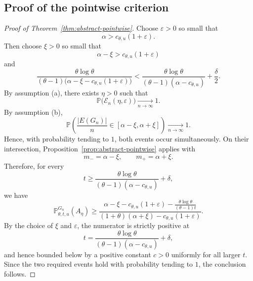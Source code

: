 \documentclass[11pt]{article}
\theoremstyle{remark}
\theoremstyle{plain}
\newcommand{\Pbb}{\mathbb{P}}
\newcommand{\1}{\mathbbm{1}}
\begin{document}
\subsection{Proof of the pointwise criterion}

\begin{proof}[Proof of Theorem~\ref{thm:abstract-pointwise}]
Choose \(\varepsilon>0\) so small that
\[
\alpha>c_{\theta,u}(1+\varepsilon).
\]
Then choose \(\xi>0\) so small that
\[
\alpha-\xi>c_{\theta,u}(1+\varepsilon)
\]
and
\[
\frac{\theta\log\theta}{(\theta-1)\bigl(\alpha-\xi-c_{\theta,u}(1+\varepsilon)\bigr)}
<
\frac{\theta\log\theta}{(\theta-1)(\alpha-c_{\theta,u})}+\frac{\delta}{2}.
\]
By assumption \textnormal{(a)}, there exists \(\eta>0\) such that
\[
\Pbb\bigl(\mathcal E_n(\eta,\varepsilon)\bigr)\xrightarrow[n\to\infty]{}1.
\]
By assumption \textnormal{(b)},
\[
\Pbb\!\left(
\frac{|E(G_n)|}{n}\in[\alpha-\xi,\alpha+\xi]
\right)\xrightarrow[n\to\infty]{}1.
\]
Hence, with probability tending to \(1\), both events occur simultaneously. On their intersection,
Proposition~\ref{prop:abstract-pointwise} applies with
\[
m_-=\alpha-\xi,
\qquad
m_+=\alpha+\xi.
\]
Therefore, for every
\[
t\ge \frac{\theta\log\theta}{(\theta-1)(\alpha-c_{\theta,u})}+\delta,
\]
we have
\[
\Pbb^{G_n}_{\theta,t,u}(A_\eta)
\ge
\frac{
\alpha-\xi-c_{\theta,u}(1+\varepsilon)-\frac{\theta\log\theta}{(\theta-1)t}
}{
(1+\theta)(\alpha+\xi)-c_{\theta,u}(1+\varepsilon)
}.
\]
By the choice of \(\xi\) and \(\varepsilon\), the numerator is strictly positive at
\[
t=\frac{\theta\log\theta}{(\theta-1)(\alpha-c_{\theta,u})}+\delta,
\]
and hence bounded below by a positive constant \(c>0\) uniformly for all larger \(t\). Since the
two required events hold with probability tending to \(1\), the conclusion follows.
\end{proof}
\end{document}
